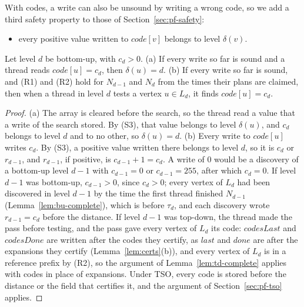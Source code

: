 With codes, a write can also be unsound by writing a wrong code, so we add a third safety property to those of Section~\ref{sec:pf-safety}:
\begin{itemize}
    \item[(S3)] every positive value written to $\mathit{code}[v]$ belongs to level $\delta(v)$.
\end{itemize}

\begin{lemma}
\label{lem:codes}
Let level $d$ be bottom-up, with $c_d > 0$. (a) If every write so far is sound and a thread reads $\mathit{code}[u] = c_d$, then $\delta(u) = d$. (b) If every write so far is sound, and (R1) and (R2) hold for $N_{d-1}$ and $N_d$ from the times their plans are claimed, then when a thread in level $d$ tests a vertex $u \in L_d$, it finds $\mathit{code}[u] = c_d$.
\end{lemma}
\begin{proof}
(a) The array is cleared before the search, so the thread read a value that a write of the search stored. By (S3), that value belongs to level $\delta(u)$, and $c_d$ belongs to level $d$ and to no other, so $\delta(u) = d$.
(b) Every write to $\mathit{code}[u]$ writes $c_d$. By (S3), a positive value written there belongs to level $d$, so it is $c_d$ or $r_{d-1}$, and $r_{d-1}$, if positive, is $c_{d-1} + 1 = c_d$. A write of 0 would be a discovery of a bottom-up level $d-1$ with $c_{d-1} = 0$ or $c_{d-1} = 255$, after which $c_d = 0$. If level $d-1$ was bottom-up, $c_{d-1} > 0$, since $c_d > 0$; every vertex of $L_d$ had been discovered in level $d-1$ by the time the first thread finished $N_{d-1}$ (Lemma~\ref{lem:bu-complete}), which is before $\tau_d$, and each discovery wrote $r_{d-1} = c_d$ before the distance. If level $d-1$ was top-down, the thread made the pass before testing, and the pass gave every vertex of $L_d$ its code: $\mathit{codesLast}$ and $\mathit{codesDone}$ are written after the codes they certify, as $\mathit{last}$ and $\mathit{done}$ are after the expansions they certify (Lemma~\ref{lem:certs}(b)), and every vertex of $L_d$ is in a reference prefix by (R2), so the argument of Lemma~\ref{lem:td-complete} applies with codes in place of expansions. Under TSO, every code is stored before the distance or the field that certifies it, and the argument of Section~\ref{sec:pf-tso} applies.
\end{proof}


